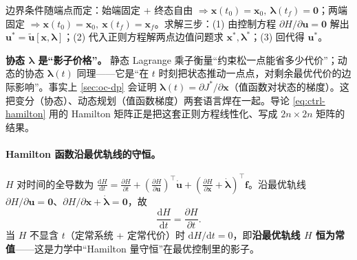 \noindent 边界条件随端点而定：始端固定 + 终态自由 $\Rightarrow\mathbf x(t_0)=\mathbf x_0,\ \boldsymbol\lambda(t_f)=\mathbf0$；两端固定 $\Rightarrow\mathbf x(t_0)=\mathbf x_0,\ \mathbf x(t_f)=\mathbf x_f$。求解三步：(1) 由控制方程 $\partial H/\partial\mathbf u=\mathbf0$ 解出 $\mathbf u^*=\tilde{\mathbf u}[\mathbf x,\boldsymbol\lambda]$；(2) 代入正则方程解两点边值问题求 $\mathbf x^*,\boldsymbol\lambda^*$；(3) 回代得 $\mathbf u^*$。

\begin{insight}
\textbf{协态 $\boldsymbol\lambda$ 是“影子价格”。}\; 静态 Lagrange 乘子衡量“约束松一点能省多少代价”；动态的协态 $\boldsymbol\lambda(t)$ 同理——它是“在 $t$ 时刻把状态推动一点点，对剩余最优代价的边际影响”。事实上 \cref{sec:oc-dp} 会证明 $\boldsymbol\lambda(t)=\partial J^*/\partial\mathbf x$（值函数对状态的梯度）。这把变分（协态）、动态规划（值函数梯度）两套语言焊在一起。导论 \cref{eq:ctrl-hamilton} 用的 Hamilton 矩阵正是把这套正则方程线性化、写成 $2n\times2n$ 矩阵的结果。
\end{insight}

\paragraph{Hamilton 函数沿最优轨线的守恒。}
$H$ 对时间的全导数为 $\frac{\mathrm dH}{\mathrm dt}=\frac{\partial H}{\partial t}+(\frac{\partial H}{\partial\mathbf u})^\top\dot{\mathbf u}+(\frac{\partial H}{\partial\mathbf x}+\dot{\boldsymbol\lambda})^\top\mathbf f$。沿最优轨线 $\partial H/\partial\mathbf u=\mathbf0$、$\partial H/\partial\mathbf x+\dot{\boldsymbol\lambda}=\mathbf0$，故
\begin{equation}
  \frac{\mathrm dH}{\mathrm dt}=\frac{\partial H}{\partial t}.
  \label{eq:oc-H-conserved}
\end{equation}
当 $H$ 不显含 $t$（定常系统 + 定常代价）时 $\mathrm dH/\mathrm dt=0$，即\textbf{沿最优轨线 $H$ 恒为常值}——这是力学中“Hamilton 量守恒”在最优控制里的影子。


